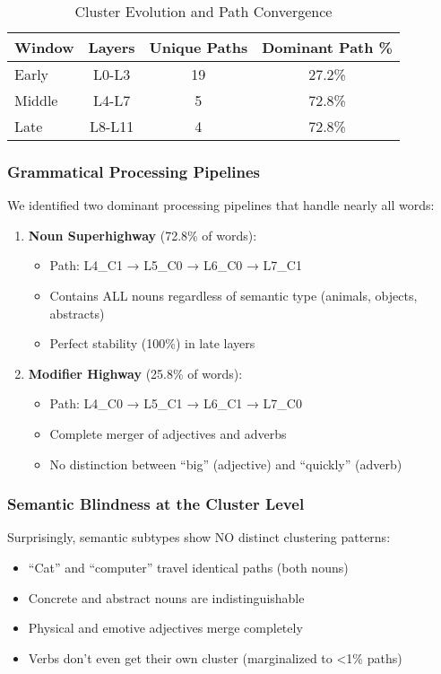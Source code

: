 \begin{table}[h!]
\centering
\caption{Cluster Evolution and Path Convergence}
\label{tab:cluster_evolution}
\begin{tabular}{lccc}
\toprule
Window & Layers & Unique Paths & Dominant Path \% \\
\midrule
Early & L0-L3 & 19 & 27.2\% \\
Middle & L4-L7 & 5 & 72.8\% \\
Late & L8-L11 & 4 & 72.8\% \\
\bottomrule
\end{tabular}
\end{table}

\subsubsection{Grammatical Processing Pipelines}

We identified two dominant processing pipelines that handle nearly all words:

\begin{enumerate}
    \item \textbf{Noun Superhighway} (72.8\% of words):
    \begin{itemize}
        \item Path: L4\_C1 → L5\_C0 → L6\_C0 → L7\_C1
        \item Contains ALL nouns regardless of semantic type (animals, objects, abstracts)
        \item Perfect stability (100\%) in late layers
    \end{itemize}
    
    \item \textbf{Modifier Highway} (25.8\% of words):
    \begin{itemize}
        \item Path: L4\_C0 → L5\_C1 → L6\_C1 → L7\_C0
        \item Complete merger of adjectives and adverbs
        \item No distinction between ``big'' (adjective) and ``quickly'' (adverb)
    \end{itemize}
\end{enumerate}

\subsubsection{Semantic Blindness at the Cluster Level}

Surprisingly, semantic subtypes show NO distinct clustering patterns:
\begin{itemize}
    \item ``Cat'' and ``computer'' travel identical paths (both nouns)
    \item Concrete and abstract nouns are indistinguishable
    \item Physical and emotive adjectives merge completely
    \item Verbs don't even get their own cluster (marginalized to <1\% paths)
\end{itemize}

